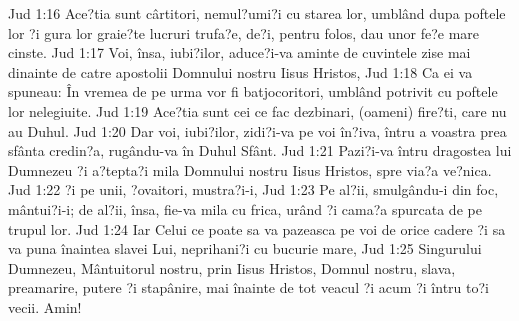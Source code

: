 Jud 1:16  Ace?tia sunt cârtitori, nemul?umi?i cu starea lor, umblând dupa poftele lor ?i gura lor graie?te lucruri trufa?e, de?i, pentru folos, dau unor fe?e mare cinste.
Jud 1:17  Voi, însa, iubi?ilor, aduce?i-va aminte de cuvintele zise mai dinainte de catre apostolii Domnului nostru Iisus Hristos,
Jud 1:18  Ca ei va spuneau: În vremea de pe urma vor fi batjocoritori, umblând potrivit cu poftele lor nelegiuite.
Jud 1:19  Ace?tia sunt cei ce fac dezbinari, (oameni) fire?ti, care nu au Duhul.
Jud 1:20  Dar voi, iubi?ilor, zidi?i-va pe voi în?iva, întru a voastra prea sfânta credin?a, rugându-va în Duhul Sfânt.
Jud 1:21  Pazi?i-va întru dragostea lui Dumnezeu ?i a?tepta?i mila Domnului nostru Iisus Hristos, spre via?a ve?nica.
Jud 1:22  ?i pe unii, ?ovaitori, mustra?i-i,
Jud 1:23  Pe al?ii, smulgându-i din foc, mântui?i-i; de al?ii, însa, fie-va mila cu frica, urând ?i cama?a spurcata de pe trupul lor.
Jud 1:24  Iar Celui ce poate sa va pazeasca pe voi de orice cadere ?i sa va puna înaintea slavei Lui, neprihani?i cu bucurie mare,
Jud 1:25  Singurului Dumnezeu, Mântuitorul nostru, prin Iisus Hristos, Domnul nostru, slava, preamarire, putere ?i stapânire, mai înainte de tot veacul ?i acum ?i întru to?i vecii. Amin!


